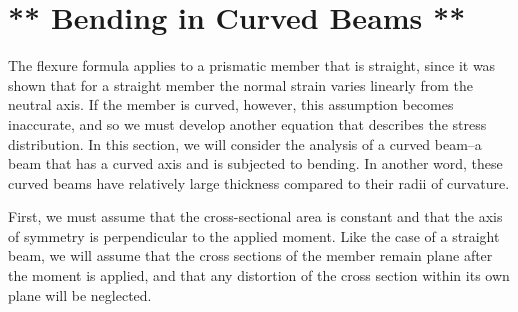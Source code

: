 \documentclass[
10pt,
a4paper,
openany,
svgnames,
]{kaobook} %
\begin{document}
\section{** Bending in Curved Beams **}
                
The flexure formula applies to a prismatic member that is straight, since it was shown that for a straight member the normal strain varies linearly from the neutral axis. If the member is curved, however, this assumption becomes inaccurate, and so we must develop another equation that describes the stress distribution. In this section, we will consider the analysis of a curved beam--a beam that has a curved axis and is subjected to bending. In another word, these curved beams have relatively large thickness compared to their radii of curvature.

First, we must assume that the cross-sectional area is constant and that the axis of symmetry is perpendicular to the applied moment. Like the case of a straight beam, we will assume that the cross sections of the member remain plane after the moment is applied, and that any distortion of the cross section within its own plane will be neglected.
\end{document}
